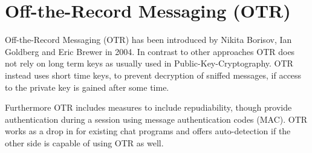 \section{Off-the-Record Messaging (OTR)}
Off-the-Record Messaging (OTR) has been introduced by
Nikita Borisov, Ian Goldberg and Eric Brewer in 2004.\cite{otr}
In contrast to other approaches OTR does not rely on long term
keys as usually used in Public-Key-Cryptography. OTR instead
uses short time keys, to prevent decryption of sniffed messages,
if access to the private key is gained after some time.

Furthermore OTR includes measures to include repudiability, though
provide authentication during a session using
message authentication codes (MAC).
OTR works as a drop in for existing chat programs and offers auto-detection
if the other side is capable of using OTR as well.
